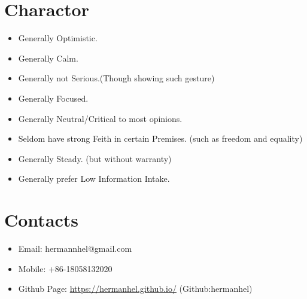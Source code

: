 \documentclass[11pt]{article}
\begin{document}
\section{Charactor}
\label{sec:org50ea902}
\begin{itemize}
\item Generally Optimistic.
\item Generally Calm.
\item Generally not Serious.(Though showing such gesture)
\item Generally Focused.
\item Generally Neutral/Critical to most opinions.
\item Seldom have strong Feith in certain Premises. (such as freedom and equality)
\item Generally Steady. (but without warranty)
\item Generally prefer Low Information Intake.
\end{itemize}
\section{Contacts}
\label{sec:org563751e}
\begin{itemize}
\item Email: hermannhel@gmail.com
\item Mobile: +86-18058132020
\item Github Page: \href{https://hermanhel.github.io/}{https://hermanhel.github.io/} (Github:hermanhel)
\end{itemize}
\end{document}

